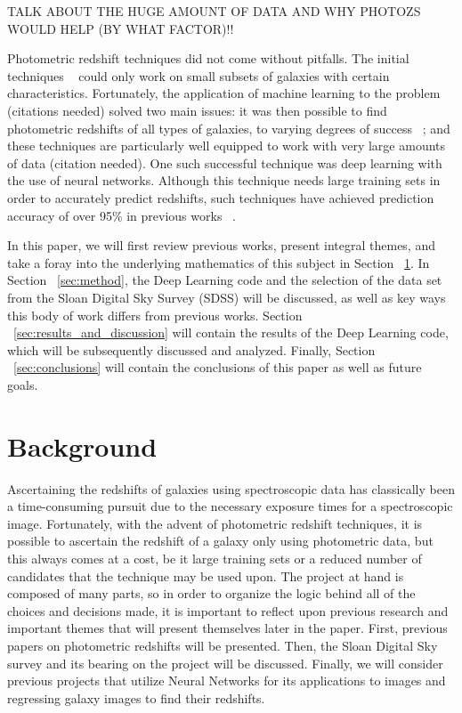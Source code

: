 \documentclass[fleqn,usenatbib]{mnras}
\begin{document}
TALK ABOUT THE HUGE AMOUNT OF DATA AND WHY PHOTOZS WOULD HELP (BY WHAT FACTOR)!!

Photometric redshift techniques did not come without pitfalls. The initial techniques ~\citep{baum_photoelectric_1962, puschell_near-infrared_1982, koo_optical_1985, connolly_slicing_1995} could only work on small subsets of galaxies with certain characteristics. Fortunately, the application of machine learning to the problem (citations needed) solved two main issues: it was then possible to find photometric redshifts of all types of galaxies, to varying degrees of success ~\citep{hildebrandt_phat:_2010}; and these techniques are particularly well equipped to work with very large amounts of data (citation needed).  One such successful technique was deep learning with the use of neural networks.  Although this technique needs large training sets in order to accurately predict redshifts, such techniques have achieved prediction accuracy of over 95\% in previous works ~\citep{hoyle_measuring_2015}. 

In this paper, we will first review previous works, present integral themes, and take a foray into the underlying mathematics of this subject in Section ~\ref{sec:review}.  In Section ~\ref{sec:method}, the Deep Learning code and the selection of the data set from the Sloan Digital Sky Survey (SDSS) will be discussed, as well as key ways this body of work differs from previous works.  Section ~\ref{sec:results_and_discussion} will contain the results of the Deep Learning code, which will be subsequently discussed and analyzed.  Finally, Section ~\ref{sec:conclusions} will contain the conclusions of this paper as well as future goals.

\section{Background}
  \label{sec:review}
Ascertaining the redshifts of galaxies using spectroscopic data has classically been a time-consuming pursuit due to the necessary exposure times for a spectroscopic image.  Fortunately, with the advent of photometric redshift techniques, it is possible to ascertain the redshift of a galaxy only using photometric data, but this always comes at a cost, be it large training sets or a reduced number of candidates that the technique may be used upon.  The project at hand is composed of many parts, so in order to organize the logic behind all of the choices and decisions made, it is important to reflect upon previous research and important themes that will present themselves later in the paper.  First, previous papers on photometric redshifts will be presented. Then, the Sloan Digital Sky survey and its bearing on the project will be discussed.  Finally, we will consider previous projects that utilize Neural Networks for its applications to images and regressing galaxy images to find their redshifts. 
\end{document}
